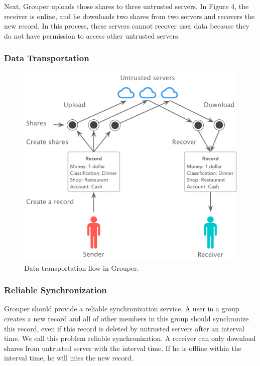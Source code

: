 \documentclass[twocolumn,10pt]{article}
\begin{document}
Next, Grouper uploads those shares to three untrusted servers. 
In Figure 4, the receiver is online, and he downloads two shares from two servers and recovers the new record. 
In this process, these servers cannot recover user data because they do not have permission to access other untrusted servers. 

\subsubsection{Data Transportation}
\begin{figure}[t]
	\centering
	\includegraphics[scale=0.38]{sync_flow}
	\caption{Data transportation flow in Grouper.}
\end{figure}

\subsubsection{Reliable Synchronization}

Grouper should provide a reliable synchronization service. 
A user in a group creates a new record and all of other members in this group should synchronize this record, even if this record is deleted by untrusted servers after an interval time. 
We call this problem reliable synchronization. 
A receiver can only download shares from untrusted server with the interval time. 
If he is offline within the interval time, he will miss the new record.
\end{document}
